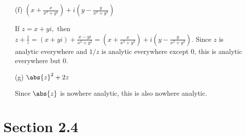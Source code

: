 \documentclass{article}
\begin{document}
\begin{itemize}
\begin{itemize}
			\item[(f)] $\left( x+\frac{x}{x^2+y^2} \right)+i\left( y-\frac{y}{x^2+y^2} \right)$
				\begin{soln}
					If $z=x+yi,$ then $ z+\frac{1}{z} = (x+yi) + \frac{x-yi}{x^2+y^2} = \left( x+\frac{x}{x^2+y^2} \right) + i\left( y-\frac{y}{x^2+y^2} \right).$ Since $z$ is analytic everywhere and $1/z$ is analytic everywhere except 0, this is analytic everywhere but 0.
				\end{soln}

			\item[(g)] $\abs{z}^2+2z$
				\begin{soln}
					Since $\abs{z}$ is nowhere analytic, this is also nowhere analytic.
				\end{soln}

		\end{itemize}

\end{itemize}

\section*{Section 2.4}
\end{document}
